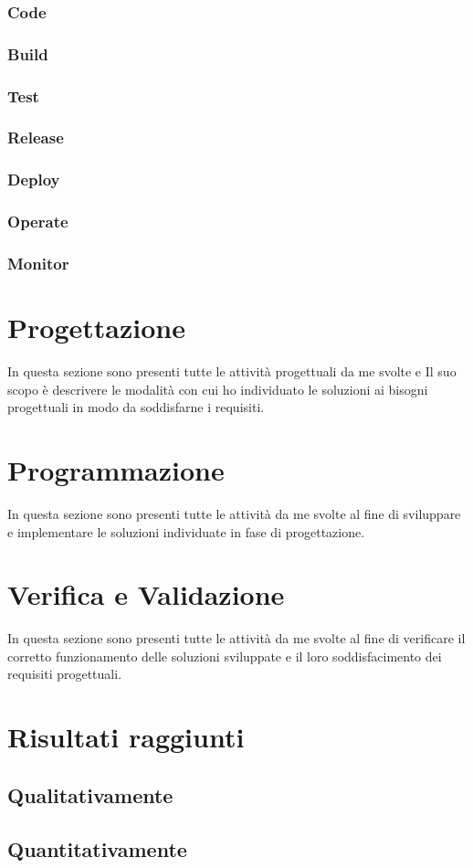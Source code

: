 \subsubsection*{Code}
\subsubsection*{Build}
\subsubsection*{Test}
\subsubsection*{Release}
\subsubsection*{Deploy}
\subsubsection*{Operate}
\subsubsection*{Monitor}

\section{Progettazione}
In questa sezione sono presenti tutte le attività progettuali da me svolte e Il suo scopo è descrivere le modalità con cui ho individuato le soluzioni ai bisogni progettuali in modo da soddisfarne i requisiti.

\section{Programmazione}
In questa sezione sono presenti tutte le attività da me svolte al fine di sviluppare e implementare le soluzioni individuate in fase di progettazione.

\section{Verifica e Validazione}
In questa sezione sono presenti tutte le attività da me svolte al fine di verificare il corretto funzionamento delle soluzioni sviluppate e il loro soddisfacimento dei requisiti progettuali.

\section{Risultati raggiunti}
\subsection{Qualitativamente}
%

\subsection{Quantitativamente}
%
